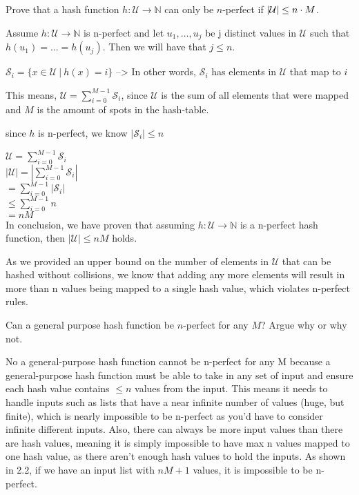 \begin{problem}
\begin{questions}
\item Prove that a hash function $h : \mathcal{U} \rightarrow \mathbb{N}$ can only be $n$-perfect if $\lvert \mathcal{U} \rvert \leq n \cdot M$.

Assume $h : \mathcal{U} \rightarrow \mathbb{N}$ is n-perfect and let 
$u_1, \dots, u_j$ be j distinct values in $\mathcal{U}$ such that $h(u_1) = \dots = h(u_j)$. Then we will have that $j \leq n$.

$\mathcal{S}_i = \{x \in \mathcal{U}\:|\:h(x) = i\}$ --> In other words, $\mathcal{S}_i$ has elements in $\mathcal{U}$ that map to $i$

This means, $\mathcal{U} = \sum_{i=0}^{M-1} \mathcal{S}_i$, since $\mathcal{U}$ is the sum of all elements that were mapped and $M$ is the amount of spots in the hash-table.

since $h$ is n-perfect, we know $|\mathcal{S}_i| \leq n$

$\mathcal{U} = \sum_{i=0}^{M-1} \mathcal{S}_i$\\
$|\mathcal{U}| = |\sum_{i=0}^{M-1} \mathcal{S}_i|$\\
$ = \sum_{i=0}^{M-1} |\mathcal{S}_i|$\\
$ \leq \sum_{i=0}^{M-1} n$\\
$ = nM $\\

In conclusion, we have proven that assuming $h : \mathcal{U} \rightarrow \mathbb{N}$ is a n-perfect hash function, then $|\mathcal{U}| \leq nM$ holds.

As we provided an upper bound on the number of elements in $\mathcal{U}$ that can be hashed without collisions, we know that adding any more elements will result in more than n values being mapped to a single hash value, which violates n-perfect rules.

\item Can a general purpose hash function be $n$-perfect for any $M$? Argue why or why not.

No a general-purpose hash function cannot be n-perfect for any M because a general-purpose hash function must be able to take in any set of input and ensure each hash value contains $\leq n$ values from the input. 
This means it needs to handle inputs such as lists that have a near infinite number of values (huge, but finite), which is nearly impossible to be n-perfect as you'd have to consider infinite different inputs. Also, there can always be more input values than there are hash values, meaning it is simply impossible to have max n values mapped to one hash value, as there aren't enough hash values to hold the inputs. As shown in 2.2, if we have an input list with $nM+1$ values, it is impossible to be n-perfect. 


\end{questions}
\end{problem}
